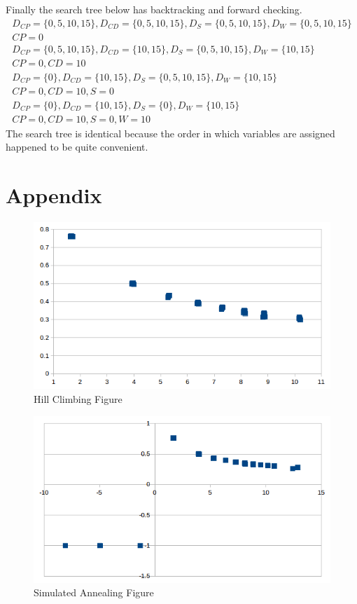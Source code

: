 \documentclass{article}
\begin{document}
Finally the search tree below has backtracking and forward checking.
\begin{gather*}
    D_{CP} = \{0, 5, 10, 15\}, D_{CD} = \{0, 5, 10, 15\}, D_{S} = \{0, 5, 10, 15\}, D_{W} = \{0, 5, 10, 15\} \\
    CP = 0 \\
    D_{CP} = \{0, 5, 10, 15\}, D_{CD} = \{10, 15\}, D_{S} = \{0, 5, 10, 15\}, D_{W} = \{10, 15\} \\
    CP = 0, CD = 10 \\
    D_{CP} = \{0\}, D_{CD} = \{10, 15\}, D_{S} = \{0, 5, 10, 15\}, D_{W} = \{10, 15\} \\
    CP = 0, CD = 10, S = 0 \\
    D_{CP} = \{0\}, D_{CD} = \{10, 15\}, D_{S} = \{0\}, D_{W} = \{10, 15\} \\
    CP = 0, CD = 10, S = 0, W = 10
\end{gather*}
The search tree is identical because the order in which variables are assigned happened to be quite convenient.

\section{Appendix}
\begin{figure}[h]
\centering
\caption{Hill Climbing Figure}
\includegraphics[keepaspectratio=true, scale=0.75]{hill-climbing}
\end{figure}
\par
\par
\begin{figure}[h]
\centering
\caption{Simulated Annealing Figure}
\includegraphics[keepaspectratio=true, scale=0.75]{simulated-annealing}
\end{figure}
\par
\par
\end{document}
